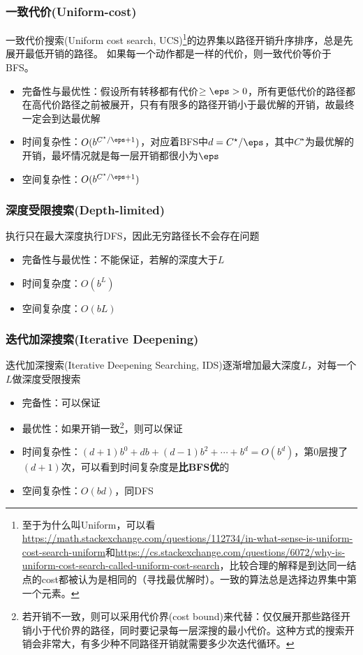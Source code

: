 \subsubsection{一致代价(Uniform-cost)}
一致代价搜索(Uniform cost search, UCS)\footnote{至于为什么叫Uniform，可以看\url{https://math.stackexchange.com/questions/112734/in-what-sense-is-uniform-cost-search-uniform}和\url{https://cs.stackexchange.com/questions/6072/why-is-uniform-cost-search-called-uniform-cost-search}，比较合理的解释是到达同一结点的cost都被认为是相同的（寻找最优解时）。一致的算法总是选择边界集中第一个元素。}的边界集以路径开销升序排序，总是先展开最低开销的路径。
如果每一个动作都是一样的代价，则一致代价等价于BFS。
\begin{itemize}
	\item 完备性与最优性：假设所有转移都有代价$\geq\eps>0$，所有更低代价的路径都在高代价路径之前被展开，只有有限多的路径开销小于最优解的开销，故最终一定会到达最优解
	\item 时间复杂性：$O(b^{C^\star/\eps+1})$，对应着BFS中$d=C^\star/\eps$，其中$C^\star$为最优解的开销，最坏情况就是每一层开销都很小为$\eps$
	\item 空间复杂性：$O(b^{C^\star/\eps+1})$
\end{itemize}

\subsubsection{深度受限搜索(Depth-limited)}
执行只在最大深度执行DFS，因此无穷路径长不会存在问题
\begin{itemize}
	\item 完备性与最优性：不能保证，若解的深度大于$L$
	\item 时间复杂度：$O(b^L)$
	\item 空间复杂度：$O(bL)$
\end{itemize}

\subsubsection{迭代加深搜索(Iterative Deepening)}
迭代加深搜索(Iterative Deepening Searching, IDS)逐渐增加最大深度$L$，对每一个$L$做深度受限搜索
\begin{itemize}
	\item 完备性：可以保证
	\item 最优性：如果开销一致\footnote{若开销不一致，则可以采用代价界(cost bound)来代替：仅仅展开那些路径开销小于代价界的路径，同时要记录每一层深搜的最小代价。这种方式的搜索开销会非常大，有多少种不同路径开销就需要多少次迭代循环。}，则可以保证
	\item 时间复杂性：$(d+1)b^0+db+(d-1)b^2+\cdots+b^d=O(b^d)$，第$0$层搜了$(d+1)$次，可以看到时间复杂度是\textbf{比BFS优}的
	\item 空间复杂性：$O(bd)$，同DFS
\end{itemize}

